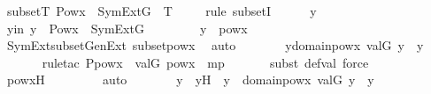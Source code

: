 \begin{isabellebody}
\ subsetT{\isacharcolon}{\kern0pt}\ {\isachardoublequoteopen}Pow{\isacharparenleft}{\kern0pt}x{\isacharparenright}{\kern0pt}\ {\isasyminter}\ SymExt{\isacharparenleft}{\kern0pt}G{\isacharparenright}{\kern0pt}\ {\isasymsubseteq}\ T{\isachardoublequoteclose}\ \isanewline
\ \ \isamarkupfalse%
\ {\isacharparenleft}{\kern0pt}rule\ subsetI{\isacharparenright}{\kern0pt}\isanewline
\ \ \ \ \isamarkupfalse%
\ y\ \isamarkupfalse%
\ yin{\isacharcolon}{\kern0pt}\ {\isachardoublequoteopen}y\ {\isasymin}\ Pow{\isacharparenleft}{\kern0pt}x{\isacharparenright}{\kern0pt}\ {\isasyminter}\ SymExt{\isacharparenleft}{\kern0pt}G{\isacharparenright}{\kern0pt}{\isachardoublequoteclose}\ \isanewline
\isanewline
\ \ \ \ \isamarkupfalse%
\ \isamarkupfalse%
\ {\isachardoublequoteopen}y\ {\isasymin}\ powx{\isachardoublequoteclose}\ \isamarkupfalse%
\ SymExt{\isacharunderscore}{\kern0pt}subset{\isacharunderscore}{\kern0pt}GenExt\ subsetpowx\ \isamarkupfalse%
\ auto\isanewline
\ \ \ \ \isamarkupfalse%
\ \isamarkupfalse%
\ {\isachardoublequoteopen}{\isasymexists}y{\isacharprime}{\kern0pt}{\isasymin}domain{\isacharparenleft}{\kern0pt}powx{\isacharprime}{\kern0pt}{\isacharparenright}{\kern0pt}{\isachardot}{\kern0pt}\ val{\isacharparenleft}{\kern0pt}G{\isacharcomma}{\kern0pt}\ y{\isacharprime}{\kern0pt}{\isacharparenright}{\kern0pt}\ {\isacharequal}{\kern0pt}\ y{\isachardoublequoteclose}\isanewline
\ \ \ \ \ \ \isamarkupfalse%
{\isacharparenleft}{\kern0pt}rule{\isacharunderscore}{\kern0pt}tac\ P{\isacharequal}{\kern0pt}{\isachardoublequoteopen}powx\ {\isacharequal}{\kern0pt}\ val{\isacharparenleft}{\kern0pt}G{\isacharcomma}{\kern0pt}\ powx{\isacharprime}{\kern0pt}{\isacharparenright}{\kern0pt}{\isachardoublequoteclose}\ \ mp{\isacharparenright}{\kern0pt}\isanewline
\ \ \ \ \ \ \isamarkupfalse%
{\isacharparenleft}{\kern0pt}subst\ def{\isacharunderscore}{\kern0pt}val{\isacharcomma}{\kern0pt}\ force{\isacharparenright}{\kern0pt}\isanewline
\ \ \ \ \ \ \isamarkupfalse%
\ powx{\isacharprime}{\kern0pt}H\ \isanewline
\ \ \ \ \ \ \isamarkupfalse%
\ auto\isanewline
\ \ \ \ \isamarkupfalse%
\ \isamarkupfalse%
\ y{\isacharprime}{\kern0pt}\ \ y{\isacharprime}{\kern0pt}H\ {\isacharcolon}{\kern0pt}\ {\isachardoublequoteopen}y{\isacharprime}{\kern0pt}\ {\isasymin}\ domain{\isacharparenleft}{\kern0pt}powx{\isacharprime}{\kern0pt}{\isacharparenright}{\kern0pt}{\isachardoublequoteclose}\ {\isachardoublequoteopen}val{\isacharparenleft}{\kern0pt}G{\isacharcomma}{\kern0pt}\ y{\isacharprime}{\kern0pt}{\isacharparenright}{\kern0pt}\ {\isacharequal}{\kern0pt}\ y{\isachardoublequoteclose}\ \isamarkupfalse%

\end{isabellebody}
